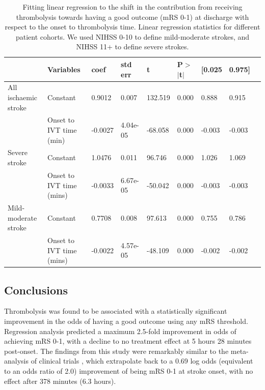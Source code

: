 \begin{table}
    \caption{Fitting linear regression to the shift in the contribution from receiving thrombolysis towards having a good outcome (mRS 0-1) at discharge with respect to the onset to thrombolysis time. Linear regression statistics for different patient cohorts. We used NIHSS 0-10 to define mild-moderate strokes, and NIHSS 11+ to define severe strokes.}
    \centering
        \begin{tabular}{lllllllll}
        \toprule
         & Variables & coef & std err & t & P$>$$|$t$|$ & [0.025 & 0.975] \\ 
         \midrule
        All ischaemic stroke & Constant & 0.9012 & 0.007 & 132.519 & 0.000 & 0.888 & 0.915\\
        & Onset to IVT time (min) &  -0.0027  & 4.04e-05 & -68.058 & 0.000 & -0.003 & -0.003\\   
        \midrule
        Severe stroke & Constant & 1.0476  &    0.011  & 96.746 & 0.000 & 1.026 & 1.069\\
        & Onset to IVT time (mins) & -0.0033 &  6.67e-05  & -50.042 & 0.000 & -0.003 & -0.003\\ 
        \midrule
        Mild-moderate stroke & Constant &           0.7708 &     0.008   & 97.613 & 0.000 & 0.755 & 0.786\\
        & Onset to IVT time (mins) &  -0.0022 &   4.57e-05 & -48.109 & 0.000 & -0.002 & -0.002\\
        \bottomrule
        \end{tabular}
      \label{fig:stats_table_mrs1}
\end{table}

\subsection{Conclusions}

 Thrombolysis was found to be associated with a statistically significant improvement in the odds of having a good outcome using any mRS threshold. Regression analysis predicted a maximum 2.5-fold improvement in odds of achieving mRS 0-1, with a decline to no treatment effect at 5 hours 28 minutes post-onset. The findings from this study were remarkably similar to the meta-analysis of clinical trials \cite{emberson_effect_2014}, which extrapolate back to a 0.69 log odds (equivalent to an odds ratio of 2.0) improvement of being mRS 0-1 at stroke onset, with no effect after 378 minutes (6.3 hours).